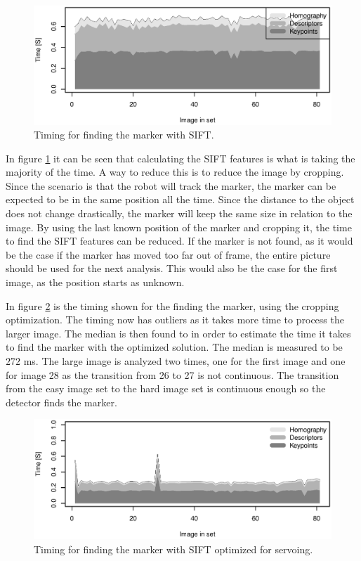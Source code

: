 \begin{figure}
 \centering
 \includegraphics[width=\linewidth]{graphics/marker3_timing_unoptimized}
 \caption{Timing for finding the marker with SIFT.}
 \label{fig:time_sift_unoptimized}
\end{figure}

In figure \ref{fig:time_sift_unoptimized} it can be seen that calculating the SIFT features is what is taking the majority of the time.
A way to reduce this is to reduce the image by cropping.
Since the scenario is that the robot will track the marker, the marker can be expected to be in the same position all the time.
Since the distance to the object does not change drastically, the marker will keep the same size in relation to the image.
By using the last known position of the marker and cropping it, the time to find the SIFT features can be reduced.
If the marker is not found, as it would be the case if the marker has moved too far out of frame, the entire picture should be used for the next analysis.
This would also be the case for the first image, as the position starts as unknown.

In figure \ref{fig:time_sift_crop} is the timing shown for the finding the marker, using the cropping optimization.
The timing now has outliers as it takes more time to process the larger image.
The median is then found to in order to estimate the time it takes to find the marker with the optimized solution.
The median is measured to be $272$ ms.
The large image is analyzed two times, one for the first image and one for image 28 as the transition from 26 to 27 is not continuous.
The transition from the easy image set to the hard image set is continuous enough so the detector finds the marker.

\begin{figure}
 \centering
 \includegraphics[width=\linewidth]{graphics/marker3_timing_crop}
 \caption{Timing for finding the marker with SIFT optimized for servoing.}
 \label{fig:time_sift_crop}
\end{figure}
